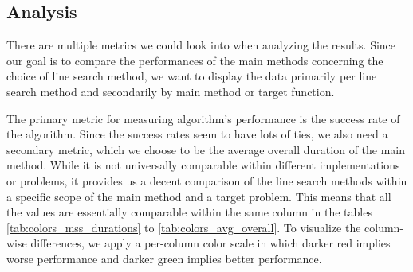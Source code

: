 \documentclass[a4paper,english,titlepage,12pt]{article}
\begin{document}
\subsection{Analysis}


There are multiple metrics we could look into when analyzing the results. Since our goal is to compare the performances of the main methods concerning the choice of line search method, we want to display the data primarily per line search method and secondarily by main method or target function.

The primary metric for measuring algorithm's performance is the success rate of the algorithm. Since the success rates seem to have lots of ties, we also need a secondary metric, which we choose to be the average overall duration of the main method. While it is not universally comparable within different implementations or problems, it provides us a decent comparison of the line search methods within a specific scope of the main method and a target problem. This means that all the values are essentially comparable within the same column in the tables \ref{tab:colors_mss_durations} to \ref{tab:colors_avg_overall}. To visualize the column-wise differences, we apply a per-column color scale in which darker red implies worse performance and darker green implies better performance.
\end{document}
